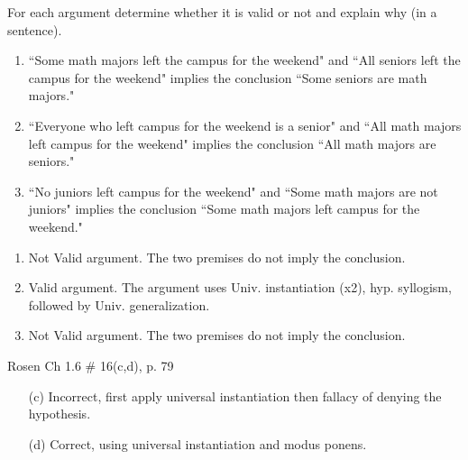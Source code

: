 \begin{questions}
 For each argument determine whether it is valid or not and explain why (in a sentence).
    \begin{enumerate}[label=(\alph*),itemsep=0pt,parsep=0pt,topsep=0pt,partopsep=0pt]
    \item ``Some math majors left the campus for the weekend" and ``All seniors left the campus for the weekend" implies the conclusion ``Some seniors are math majors."
    \item ``Everyone who left campus for the weekend is a senior" and ``All math majors left campus for the weekend"  implies the conclusion ``All math majors are seniors." 
    \item ``No juniors left campus for the weekend" and ``Some math majors are not juniors" implies the conclusion ``Some math majors left campus for the weekend."
    \end{enumerate}
   \ifprintanswers
        \vspace{-10pt}
    \fi
\begin{solution}
    \begin{enumerate}[label=(\alph*),itemsep=0pt,parsep=0pt,topsep=0pt,partopsep=0pt]
        \item Not Valid argument.  The two premises do not imply the conclusion.
        \item Valid argument. The argument uses Univ. instantiation (x2), hyp. syllogism, followed by Univ. generalization.
        \item Not Valid argument.  The two premises do not imply the conclusion.
    \end{enumerate}
\end{solution}



 Rosen Ch 1.6 \# 16(c,d), p. 79
    \ifprintanswers
        \vspace{-15pt}
    \fi
\begin{solution}
    \begin{itemize}[itemsep=0pt,parsep=0pt,topsep=0pt,partopsep=0pt]
        \item[(c)] Incorrect, first apply universal instantiation then fallacy of denying the hypothesis.
       \item[(d)] Correct, using universal instantiation and modus ponens.
    \end{itemize}
\end{solution}




\end{questions}
